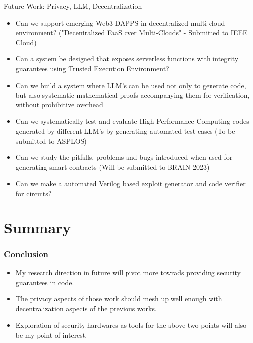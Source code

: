 \documentclass[10pt,aspectratio=169]{beamer}
\begin{document}
\begin{frame}[fragile]{Future Work: Privacy, LLM, Decentralization}

 \begin{itemize}
\item Can we support emerging Web3 DAPPS in decentralized multi cloud environment? 
("Decentralized FaaS over Multi-Clouds" - Submitted to IEEE Cloud)
\item Can a system be designed that exposes serverless functions with integrity guarantees using Trusted Execution Environment?
\item Can we build a system where LLM's can be used not only to generate code, but also systematic mathematical proofs accompanying them for verification, without prohibitive overhead
\item Can we systematically test and evaluate High Performance Computing codes generated by different LLM's by generating automated test cases (To be submitted to ASPLOS)
\item Can we study the pitfalls, problems and bugs introduced when used for generating smart contracts (Will be submitted to BRAIN 2023)
\item Can we make a automated Verilog based exploit generator and code verifier for circuits?
\end{itemize}
\end{frame}


\section{Summary}

\begin{frame}
\frametitle{Conclusion}
\begin{itemize}
\item  My research direction in future will pivot more towrads providing security guarantees in code.
\item The privacy aspects of those work should mesh up well enough with decentralization aspects of the previous works.
\item Exploration of security hardwares as tools for the above two points will also be my point of interest.
\end{itemize}
\end{frame}

\end{document}
